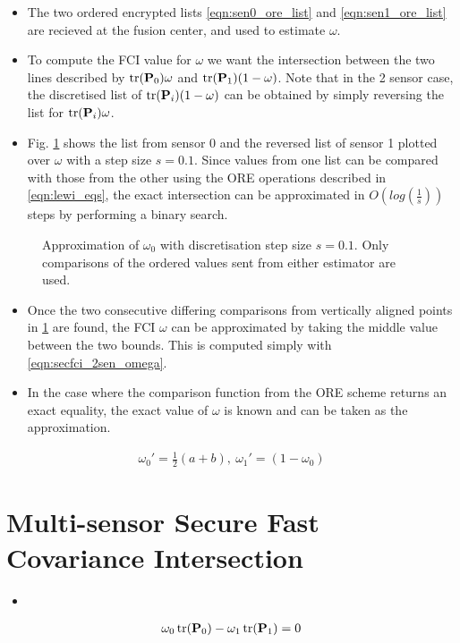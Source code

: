 \documentclass[letterpaper, 10 pt, conference]{ieeeconf}  %
\begin{document}
\begin{itemize}
   \item The two ordered encrypted lists \eqref{eqn:sen0_ore_list} and \eqref{eqn:sen1_ore_list} are recieved at the fusion center, and used to estimate $\omega$.
   \item To compute the FCI value for $\omega$ we want the intersection between the two lines described by $\operatorname{tr}({{\mathbf{P}}}_0)\omega$ and $\operatorname{tr}({{\mathbf{P}}}_1)(1-\omega)$. Note that in the 2 sensor case, the discretised list of $\operatorname{tr}({{\mathbf{P}}}_i)(1-\omega)$ can be obtained by simply reversing the list for $\operatorname{tr}({{\mathbf{P}}}_i)\omega$.
   \item Fig. \ref{fig:2_sensor_sol} shows the list from sensor 0 and the reversed list of sensor 1 plotted over $\omega$ with a step size $s=0.1$. Since values from one list can be compared with those from the other using the ORE operations described in \eqref{eqn:lewi_eqs}, the exact intersection can be approximated in $O(log(\frac{1}{s}))$ steps by performing a binary search.
\end{itemize}
\begin{figure}[htb]
   \begin{center}
      
   \end{center}
   \caption{Approximation of $\omega_0$ with discretisation step size $s=0.1$. Only comparisons of the ordered values sent from either estimator are used.}
   \label{fig:2_sensor_sol}
\end{figure}
\begin{itemize}
   \item Once the two consecutive differing comparisons from vertically aligned points in \ref{fig:2_sensor_sol} are found, the FCI $\omega$ can be approximated by taking the middle value between the two bounds. This is computed simply with \eqref{eqn:secfci_2sen_omega}.
   \item In the case where the comparison function from the ORE scheme returns an exact equality, the exact value of $\omega$ is known and can be taken as the approximation.
\end{itemize}
\begin{gather}
   \omega_0'=\frac{1}{2}(a + b),\ \omega_1' = (1-\omega_0) \label{eqn:secfci_2sen_omega}
\end{gather}

\section{Multi-sensor Secure Fast Covariance Intersection} \label{sec:multi_secfci}
\begin{itemize}
   \item 
\end{itemize}
\begin{gather}
   \omega_0 \operatorname{tr}({{\mathbf{P}}}_0) - \omega_1 \operatorname{tr}({{\mathbf{P}}}_1) = 0 \label{eqn:3-sensor-partial-sol-1}
\end{gather}
\end{document}
